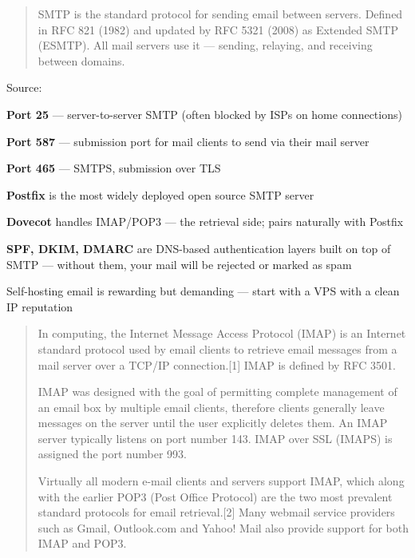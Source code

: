 \documentclass[Screen16to9,17pt]{foils}
\begin{document}

\begin{quote}
SMTP is the standard protocol for sending email between servers.
Defined in RFC 821 (1982) and updated by RFC 5321 (2008) as Extended SMTP (ESMTP).
All mail servers use it — sending, relaying, and receiving between domains.
\end{quote}

Source: 

\begin{list2}
\item {\bf Port 25} — server-to-server SMTP (often blocked by ISPs on home connections)
\item {\bf Port 587} — submission port for mail clients to send via their mail server
\item {\bf Port 465} — SMTPS, submission over TLS
\item {\bf Postfix} is the most widely deployed open source SMTP server 
\item {\bf Dovecot} handles IMAP/POP3 — the retrieval side; pairs naturally with Postfix 
\item {\bf SPF, DKIM, DMARC} are DNS-based authentication layers built on top of SMTP —
without them, your mail will be rejected or marked as spam
\item Self-hosting email is rewarding but demanding — start with a VPS with a clean IP reputation
\end{list2}

\begin{quote}
In computing, the Internet Message Access Protocol (IMAP) is an Internet standard protocol used by email clients to retrieve email messages from a mail server over a TCP/IP connection.[1] IMAP is defined by RFC 3501.

IMAP was designed with the goal of permitting complete management of an email box by multiple email clients, therefore clients generally leave messages on the server until the user explicitly deletes them. An IMAP server typically listens on port number 143. IMAP over SSL (IMAPS) is assigned the port number 993.

Virtually all modern e-mail clients and servers support IMAP, which along with the earlier POP3 (Post Office Protocol) are the two most prevalent standard protocols for email retrieval.[2] Many webmail service providers such as Gmail, Outlook.com and Yahoo! Mail also provide support for both IMAP and POP3.
\end{quote}
\end{document}
